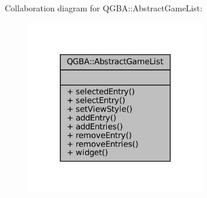 Collaboration diagram for Q\+G\+BA\+:\+:Abstract\+Game\+List\+:
\nopagebreak
\begin{figure}[H]
\begin{center}
\leavevmode
\includegraphics[width=218pt]{class_q_g_b_a_1_1_abstract_game_list__coll__graph}
\end{center}
\end{figure}
